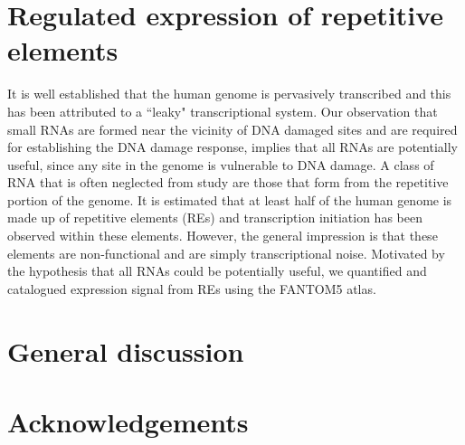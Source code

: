 \documentclass[10pt,a4paper]{report}
\begin{document}


%
%

%
%

\chapter{Regulated expression of repetitive elements}\label{repeat}


It is well established that the human genome is pervasively transcribed and this has been attributed to a ``leaky" transcriptional system. Our observation that small RNAs are formed near the vicinity of DNA damaged sites and are required for establishing the DNA damage response, implies that all RNAs are potentially useful, since any site in the genome is vulnerable to DNA damage. A class of RNA that is often neglected from study are those that form from the repetitive portion of the genome. It is estimated that at least half of the human genome is made up of repetitive elements (REs) and transcription initiation has been observed within these elements\cite{pmid19377475}. However, the general impression is that these elements are non-functional and are simply transcriptional noise. Motivated by the hypothesis that all RNAs could be potentially useful, we quantified and catalogued expression signal from REs using the FANTOM5 atlas.



%

\chapter{General discussion}\label{discussion}


\chapter*{Acknowledgements}




\end{document}
